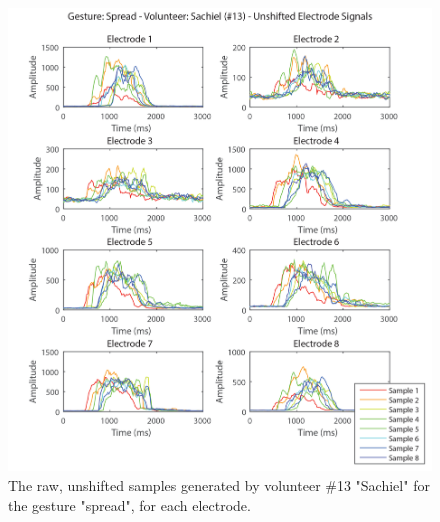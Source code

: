 \documentclass[journal]{IEEEtran}
\begin{document}
    \begin{figure}[H]
    \centering
    \includegraphics[width=1\columnwidth]{EMG/Spread_Max_Sachiel_Unshifted}
    \caption{The raw, unshifted samples generated by volunteer \#13 "Sachiel" for the gesture "spread", for each electrode.}
    \label{Spread_Max_Sachiel_Unshifted}
    \end{figure}
    
\end{document}
